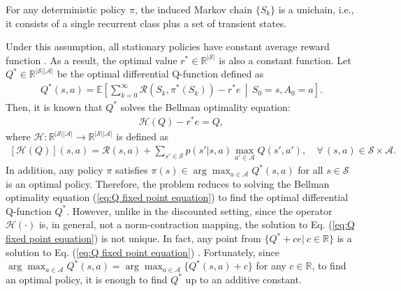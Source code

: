 \documentclass[11 pt]{article}
\begin{document}
	\begin{assumption}
		\label{assumption:unichain mdp}
		For any deterministic policy $\pi$, the induced Markov chain $\{S_k\}$ is a unichain, i.e., it consists of a single recurrent class plus a set of transient states.
	\end{assumption}
	
	
	Under this assumption, all stationary policies have constant average reward function \cite{bertsekas2011dynamic,puterman2014markov}. As a result, the optimal value $r^*\in\mathbb{R}^{|\mathcal{S}|}$ is also a constant function. Let $Q^*\in\mathbb{R}^{|\mathcal{S}||\mathcal{A}|}$ be the optimal differential Q-function defined as 
	\begin{align*}
		Q^*(s,a)=\mathbb{E}\left[\sum^\infty_{k=0}\mathcal{R}(S_k,\pi^*(S_k))-r^*e\,\middle|\,S_0=s,A_0=a\right].
	\end{align*}
	Then, it is known that $Q^*$ solves the Bellman optimality equation:
	\begin{align}\label{eq:Q fixed point equation}
		\mathcal{H}(Q) - r^* e = Q,
	\end{align}
	where $\mathcal{H}: \mathbb{R}^{|\mathcal{S}| |\mathcal{A}|} \to\mathbb{R}^{|\mathcal{S}||\mathcal{A}|}$ is defined as
	\begin{align}\label{eq:Q_Bellman}
		[\mathcal{H}(Q)](s,a) = \mathcal{R}(s,a) + \sum_{s' \in \mathcal{S}} p(s'|s,a) \max_{a' \in \mathcal{A}} Q(s', a'), \quad \forall\, (s,a)\in \mathcal{S}\times \mathcal{A}.
	\end{align}
	In addition, any policy $\pi$ satisfies  $\pi(s)\in\arg\max_{a\in\mathcal{A}}Q^*(s,a)$ for all $s\in\mathcal{S}$ is an optimal policy. Therefore, the problem reduces to solving the Bellman optimality equation (\ref{eq:Q fixed point equation}) to find the optimal differential Q-function $Q^*$. However, unlike in the discounted setting, since the operator $\mathcal{H}(\cdot)$ is, in general, not a norm-contraction mapping, the solution to Eq. (\ref{eq:Q fixed point equation}) is not unique. In fact, any point from $\{Q^*+ce | ~c \in \mathbb{R}\}$ is a solution to Eq. (\ref{eq:Q fixed point equation}) \cite{puterman2014markov}. Fortunately, since $\arg\max_{a\in\mathcal{A}}Q^*(s,a)=\arg\max_{a\in\mathcal{A}}\{Q^*(s,a)+c\}$ for any $c\in\mathbb{R}$, to find an optimal policy, it is enough to find $Q^*$ up to an additive constant. 
	
\end{document}
